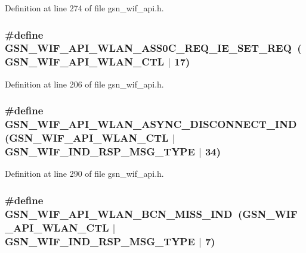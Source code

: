 Definition at line 274 of file gsn\_\-wif\_\-api.h.

\hypertarget{a00606_a31be24f62b1eee84f63d1d0fa328dd23}{
\subsubsection[{GSN\_\-WIF\_\-API\_\-WLAN\_\-ASS0C\_\-REQ\_\-IE\_\-SET\_\-REQ}]{\setlength{\rightskip}{0pt plus 5cm}\#define GSN\_\-WIF\_\-API\_\-WLAN\_\-ASS0C\_\-REQ\_\-IE\_\-SET\_\-REQ~(GSN\_\-WIF\_\-API\_\-WLAN\_\-CTL $|$ 17)}}
\label{a00606_a31be24f62b1eee84f63d1d0fa328dd23}


Definition at line 206 of file gsn\_\-wif\_\-api.h.

\hypertarget{a00606_aa1066ce81555519d97215091bf494941}{
\subsubsection[{GSN\_\-WIF\_\-API\_\-WLAN\_\-ASYNC\_\-DISCONNECT\_\-IND}]{\setlength{\rightskip}{0pt plus 5cm}\#define GSN\_\-WIF\_\-API\_\-WLAN\_\-ASYNC\_\-DISCONNECT\_\-IND~(GSN\_\-WIF\_\-API\_\-WLAN\_\-CTL $|$ GSN\_\-WIF\_\-IND\_\-RSP\_\-MSG\_\-TYPE $|$ 34)}}
\label{a00606_aa1066ce81555519d97215091bf494941}


Definition at line 290 of file gsn\_\-wif\_\-api.h.

\hypertarget{a00606_ac5717c171a79a8a3989e00909337a097}{
\subsubsection[{GSN\_\-WIF\_\-API\_\-WLAN\_\-BCN\_\-MISS\_\-IND}]{\setlength{\rightskip}{0pt plus 5cm}\#define GSN\_\-WIF\_\-API\_\-WLAN\_\-BCN\_\-MISS\_\-IND~(GSN\_\-WIF\_\-API\_\-WLAN\_\-CTL $|$ GSN\_\-WIF\_\-IND\_\-RSP\_\-MSG\_\-TYPE $|$ 7)}}
\label{a00606_ac5717c171a79a8a3989e00909337a097}


